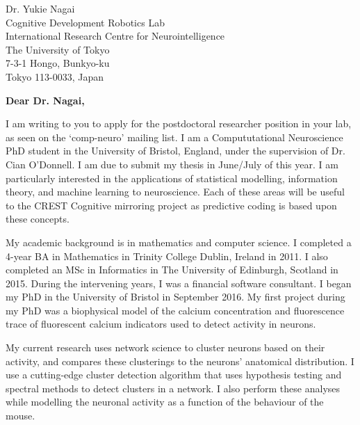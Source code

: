 \documentclass[11pt]{letter} %
\begin{document}

\begin{letter}{Dr. Yukie Nagai \\ 
  Cognitive Development Robotics Lab \\ 
  International Research Centre for Neurointelligence \\
  The University of Tokyo \\
  7-3-1 Hongo, Bunkyo-ku \\
  Tokyo 113-0033, Japan} %


  \opening{\textbf{Dear Dr. Nagai,}}
  
  I am writing to you to apply for the postdoctoral researcher position in your lab, as seen on the `comp-neuro' mailing list. I am a Compututational Neuroscience PhD student in the University of Bristol, England, under the supervision of Dr. Cian O'Donnell. I am due to submit my thesis in June/July of this year. I am particularly interested in the applications of statistical modelling, information theory, and machine learning to neuroscience. Each of these areas will be useful to the CREST Cognitive mirroring project as predictive coding is based upon these concepts.

  My academic background is in mathematics and computer science. I completed a 4-year BA in Mathematics in Trinity College Dublin, Ireland in 2011. I also completed an MSc in Informatics in The University of Edinburgh, Scotland in 2015. During the intervening years, I was a financial software consultant. I began my PhD in the University of Bristol in September 2016. My first project during my PhD was a biophysical model of the calcium concentration and fluorescence trace of fluorescent calcium indicators used to detect activity in neurons. 

  My current research uses network science to cluster neurons based on their activity, and compares these clusterings to the neurons' anatomical distribution. I use a cutting-edge cluster detection algorithm that uses hypothesis testing and spectral methods to detect clusters in a network. I also perform these analyses while modelling the neuronal activity as a function of the behaviour of the mouse.


\end{letter}
\end{document}

